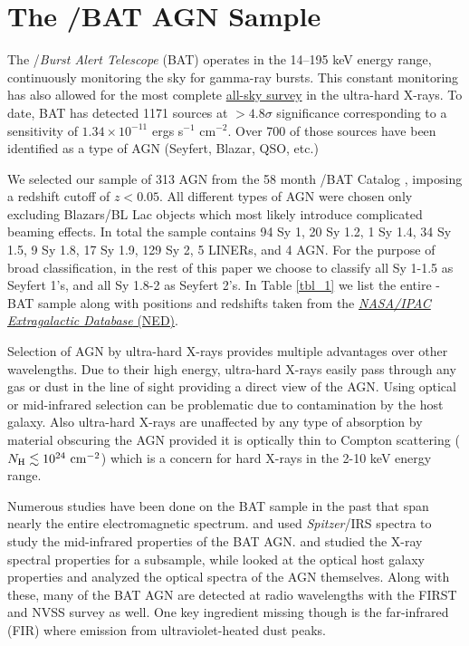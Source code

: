 \section{The \swift/BAT AGN Sample}\label{sample}
The  \swift/\textit{Burst Alert Telescope} (BAT) \cite{Barthelmy_2005,Gehrels_2004} operates in the 14--195 keV energy range, continuously monitoring the sky for gamma-ray bursts. This constant monitoring has also allowed for the most complete \href{https://swift.gsfc.nasa.gov/results/bs70mon/}{all-sky survey} in the ultra-hard X-rays. To date, BAT has detected 1171 sources at  $>4.8\sigma$ significance corresponding to a sensitivity of $1.34\times10^{-11}$ ergs s$^{-1}$ cm$^{-2}$. Over 700 of those sources have been identified as a type of AGN (Seyfert, Blazar, QSO, etc.)

We selected our sample of 313 AGN from the 58 month \swift/BAT Catalog \citep{Baumgartner:2012gf}, imposing a redshift cutoff of $z<0.05$. All different types of AGN were chosen only excluding Blazars/BL Lac objects which most likely introduce complicated beaming effects. In total the sample contains 94 Sy 1, 20 Sy 1.2, 1 Sy 1.4, 34 Sy 1.5, 9 Sy 1.8, 17 Sy 1.9, 129 Sy 2, 5 LINERs, and 4 AGN. For the purpose of broad classification, in the rest of this paper we choose to classify all Sy 1-1.5 as Seyfert 1's, and all Sy 1.8-2 as Seyfert 2's. In Table \ref{tbl_1} we list the entire \herschel{}-BAT sample along with positions and redshifts taken from the \href{http://ned.ipac.caltech.edu/}{\textit{NASA/IPAC Extragalactic Database} (NED)}.

Selection of AGN by ultra-hard X-rays provides multiple advantages over other wavelengths. Due to their high energy, ultra-hard X-rays easily pass through any gas or dust in the line of sight providing a direct view of the AGN. Using optical or mid-infrared selection can be problematic due to contamination by the host galaxy. Also ultra-hard X-rays are unaffected by any type of absorption by material obscuring the AGN provided it is optically thin to Compton scattering ($N_{\rm{H}} \lesssim 10^{24}\,\, \rm{cm}^{-2}$) which is a concern for hard X-rays in the 2-10 keV energy range.

Numerous studies have been done on the BAT sample in the past that span nearly the entire electromagnetic spectrum. \citet{Weaver:2010rt} and \citet{Melendez:2008pd} used \textit{Spitzer}/IRS spectra to study the mid-infrared properties of the BAT AGN. \cite{Winter:2009kx} and \cite{Vasudevan:2013dz} studied the X-ray spectral properties for a subsample, while \citet{Koss:2011vn} looked at the optical host galaxy properties and \citep{Winter:2010yq} analyzed the optical spectra of the AGN themselves. Along with these, many of the BAT AGN are detected at radio wavelengths with the FIRST \citep{Becker:1995lq} and NVSS \citep{Condon:1998eu} survey as well. One key ingredient missing though is the far-infrared (FIR) where emission from ultraviolet-heated dust peaks.
  
  
  